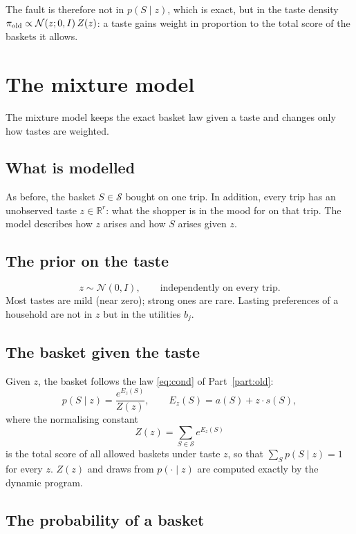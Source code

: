 \documentclass[11pt,a4paper]{article}
\newcommand{\N}{\mathcal N}
\newcommand{\R}{\mathbb R}
\begin{document}
The fault is therefore not in $p(S\mid z)$, which is exact, but in the taste density $\pi_{\rm old}\propto\N(z;0,I)\,Z(z)$:
a taste gains weight in proportion to the total score of the baskets it allows.

\section{The mixture model}\label{part:mix}

The mixture model keeps the exact basket law given a taste and changes only how tastes are weighted.

\subsection{What is modelled}

As before, the basket $S\in\mathcal S$ bought on one trip. In addition, every trip has an unobserved taste
$z\in\R^r$: what the shopper is in the mood for on that trip. The model describes how $z$ arises and how $S$
arises given $z$.

\subsection{The prior on the taste}

\begin{equation}
z\sim\N(0,I),\qquad\text{independently on every trip.}
\label{eq:prior}
\end{equation}
Most tastes are mild (near zero); strong ones are rare. Lasting preferences of a household are not in $z$ but in
the utilities $b_j$.

\subsection{The basket given the taste}

Given $z$, the basket follows the law \eqref{eq:cond} of Part~\ref{part:old}:
\[
p(S\mid z)=\frac{e^{E_z(S)}}{Z(z)},\qquad E_z(S)=a(S)+z\cdot s(S),
\]
where the normalising constant
\[
Z(z)=\sum_{S\in\mathcal S}e^{E_z(S)}
\]
is the total score of all allowed baskets under taste $z$, so that $\sum_Sp(S\mid z)=1$ for every $z$. $Z(z)$ and
draws from $p(\cdot\mid z)$ are computed exactly by the dynamic program.

\subsection{The probability of a basket}
\end{document}
